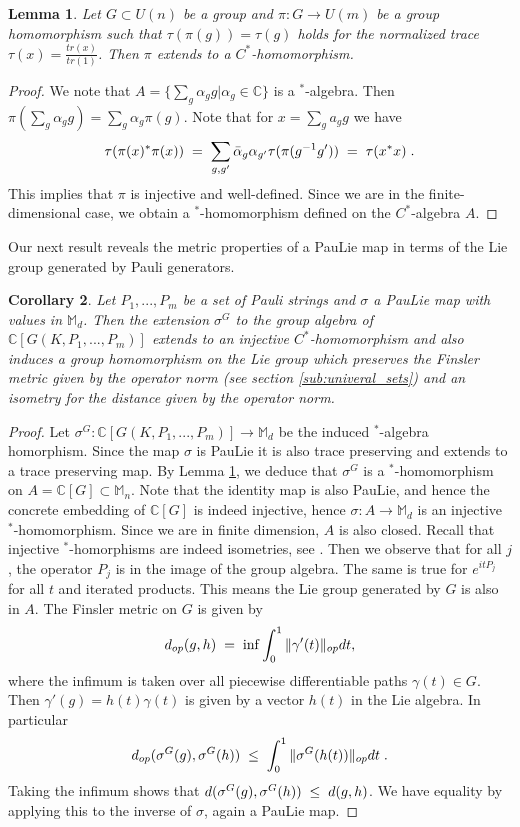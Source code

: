 \documentclass[12pt, a4-paper]{amsart}
\numberwithin{equation}{section}
\newcommand{\kl}{\pl \le \pl}
\newcommand{\lel}{\pl = \pl}
\newcommand{\cz}{{\mathbb C}}
\newcommand{\pl}{\hspace{.1cm}}
\newcommand{\al}{\alpha}
\newcommand{\mz}{{\mathbb M}}
\newcommand{\si}{\sigma}
\newtheorem{lemma}{Lemma}[section]
\newtheorem{cor}[lemma]{Corollary}
\begin{document}
\begin{lemma}\label{cstar} Let $G\subset U(n)$ be a group and $\pi:G\to U(m)$ be a group homomorphism such that $\tau(\pi(g))=\tau(g)$ holds for the normalized trace $\tau(x)=\frac{tr(x)}{tr(1)}$. Then $\pi$ extends to a $C^*$-homomorphism.
\end{lemma}

\begin{proof} We note that $A=\{\sum_g \al_g g|\al_g \in \cz\}$ is a $^*$-algebra. Then 
 $\pi(\sum_g\al_g g)=\sum_{g}\al_g \pi(g)$. Note that for $x=\sum_g a_gg$ we have  
  \[ 
  \tau(\pi(x)^*\pi(x)) \lel \sum_{g,g'}\bar{\al}_g\al_{g'}\tau(\pi(g^{-1}g') )
  \lel \tau(x^*x) \pl. 
  \] 
This implies that $\pi$ is injective and well-defined. Since we are in the finite-dimensional case, we obtain a $^*$-homomorphism defined on the $C^*$-algebra $A$. \end{proof}  

Our next result reveals the metric properties 
of a PauLie map in terms of the Lie group generated by Pauli generators. 

\begin{cor} Let $P_1,...,P_m$ be a set of Pauli strings and $\si$ a PauLie map with values in $\mz_d$. Then the extension $\si^G$ to the group algebra of $\cz[G(K,P_1,...,P_m)]$ extends to an injective $C^*$-homomorphism and also induces a group homomorphism on the Lie group  which preserves the Finsler metric given by the operator norm (see section \ref{sub:univeral_sets})  and an isometry for the distance given by the operator norm. 
\end{cor} 

\begin{proof} Let $\si^{G}:\cz[G(K,P_1,...,P_m)]\to \mz_d$ be the induced $^*$-algebra homorphism. Since the map $\si$ is PauLie it is also trace preserving and extends to a trace preserving map. By Lemma \ref{cstar}, we deduce that $\si^{G}$ is a $^*$-homomorphism on $A=\cz[G]\subset \mz_n$. Note that the identity map is also PauLie, and hence the concrete embedding of $\cz[G]$ is indeed injective, hence $\si:A\to \mz_d$ is an injective $^*$-homomorphism.  Since we are  in finite dimension, $A$ is also closed.  Recall that injective $^*$-homorphisms are indeed isometries, see \cite{TAk1}. Then we observe that for all $j$, the operator $P_j$ is in the image of  the group algebra. The same is true for $e^{itP_j}$ for all $t$ and iterated products. This means the Lie group generated by $G$ is also in $A$. The Finsler metric on $G$ is given by 
 \[ d_{op}(g,h) \lel \inf \int_0^1 \|\gamma'(t)\|_{op} dt, \]
where the infimum is taken over all piecewise differentiable paths $\gamma(t)\in G$. Then $\gamma'(g)=h(t)\gamma(t)$ is given by a vector $h(t)$ in the Lie algebra. In particular 
 \[ d_{op}(\si^G(g),\si^G(h)) \kl \int_0^1 \|\si^G(h(t))\|_{op} dt \pl. \]
Taking the infimum shows that $d(\si^G(g),\si^G(h))\kl d(g,h)$. We have equality by applying this to the inverse of $\si$, again a PauLie map.   
\end{proof}
\end{document}
